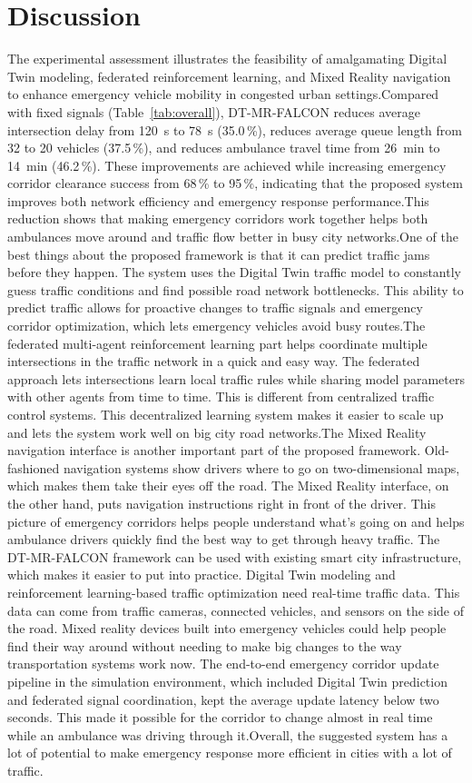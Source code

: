 \documentclass[conference]{IEEEtran}
\begin{document}
\section{Discussion}
The experimental assessment illustrates the feasibility of amalgamating Digital Twin modeling, federated reinforcement learning, and Mixed Reality navigation to enhance emergency vehicle mobility in congested urban settings.Compared with fixed signals (Table~\ref{tab:overall}), DT-MR-FALCON reduces average intersection delay from 120~s to 78~s (35.0\,\%), reduces average queue length from 32 to 20 vehicles (37.5\,\%), and reduces ambulance travel time from 26~min to 14~min (46.2\,\%). These improvements are achieved while increasing emergency corridor clearance success from 68\,\% to 95\,\%, indicating that the proposed system improves both network efficiency and emergency response performance.This reduction shows that making emergency corridors work together helps both ambulances move around and traffic flow better in busy city networks.One of the best things about the proposed framework is that it can predict traffic jams before they happen. The system uses the Digital Twin traffic model to constantly guess traffic conditions and find possible road network bottlenecks. This ability to predict traffic allows for proactive changes to traffic signals and emergency corridor optimization, which lets emergency vehicles avoid busy routes.The federated multi-agent reinforcement learning part helps coordinate multiple intersections in the traffic network in a quick and easy way. The federated approach lets intersections learn local traffic rules while sharing model parameters with other agents from time to time. This is different from centralized traffic control systems. This decentralized learning system makes it easier to scale up and lets the system work well on big city road networks.The Mixed Reality navigation interface is another important part of the proposed framework. Old-fashioned navigation systems show drivers where to go on two-dimensional maps, which makes them take their eyes off the road. The Mixed Reality interface, on the other hand, puts navigation instructions right in front of the driver. This picture of emergency corridors helps people understand what's going on and helps ambulance drivers quickly find the best way to get through heavy traffic.
The DT-MR-FALCON framework can be used with existing smart city infrastructure, which makes it easier to put into practice. Digital Twin modeling and reinforcement learning-based traffic optimization need real-time traffic data. This data can come from traffic cameras, connected vehicles, and sensors on the side of the road. Mixed reality devices built into emergency vehicles could help people find their way around without needing to make big changes to the way transportation systems work now. The end-to-end emergency corridor update pipeline in the simulation environment, which included Digital Twin prediction and federated signal coordination, kept the average update latency below two seconds. This made it possible for the corridor to change almost in real time while an ambulance was driving through it.Overall, the suggested system has a lot of potential to make emergency response more efficient in cities with a lot of traffic.
\end{document}
